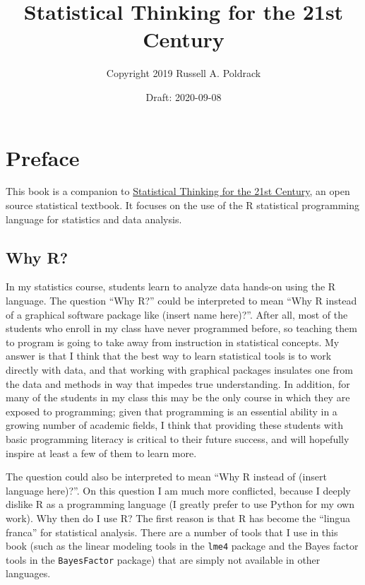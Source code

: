 \documentclass[12pt,]{book}
\title{Statistical Thinking for the 21st Century}
\author{Copyright 2019 Russell A. Poldrack}
\date{Draft: 2020-09-08}
\begin{document}
\maketitle

{
\setcounter{tocdepth}{1}
\tableofcontents
}
\hypertarget{preface}{%
\chapter*{Preface}\label{preface}}

This book is a companion to \href{https://statsthinking21.org/}{Statistical Thinking for the 21st Century}, an open source statistical textbook. It focuses on the use of the R statistical programming language for statistics and data analysis.

\hypertarget{why-r}{%
\section{Why R?}\label{why-r}}

In my statistics course, students learn to analyze data hands-on using the R language. The question ``Why R?'' could be interpreted to mean ``Why R instead of a graphical software package like (insert name here)?''. After all, most of the students who enroll in my class have never programmed before, so teaching them to program is going to take away from instruction in statistical concepts. My answer is that I think that the best way to learn statistical tools is to work directly with data, and that working with graphical packages insulates one from the data and methods in way that impedes true understanding. In addition, for many of the students in my class this may be the only course in which they are exposed to programming; given that programming is an essential ability in a growing number of academic fields, I think that providing these students with basic programming literacy is critical to their future success, and will hopefully inspire at least a few of them to learn more.

The question could also be interpreted to mean ``Why R instead of (insert language here)?''. On this question I am much more conflicted, because I deeply dislike R as a programming language (I greatly prefer to use Python for my own work). Why then do I use R? The first reason is that R has become the ``lingua franca'' for statistical analysis. There are a number of tools that I use in this book (such as the linear modeling tools in the \texttt{lme4} package and the Bayes factor tools in the \texttt{BayesFactor} package) that are simply not available in other languages.
\end{document}
